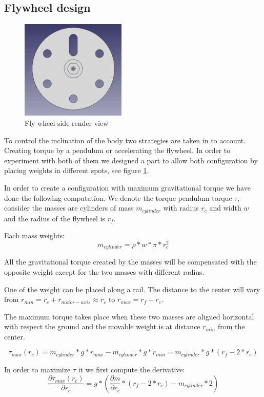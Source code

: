 \subsection{Flywheel design}
\begin{figure}
	\centering
	\includegraphics[width=5cm]{img/fly_wheel_side.png}
	\caption{Fly wheel side render view}
	\label{fig:Fly wheel side render view}
\end{figure}

To control the inclination of the body two strategies are taken in to account. Creating torque by a pendulum or accelerating the flywheel. In order to experiment with both of them we designed a part to allow both configuration by placing weights in different spots, see figure \ref{fig:Fly wheel side render view}.

In order to create a configuration with maximum gravitational torque we have done the following computation. We denote the torque pendulum torque $\tau$, consider the masses are cylinders of mass $m_{cylinder}$ with radius $r_c$ and width $w$ and the radius of the flywheel is $r_f$.

Each mass weights:
\[ m_{cylinder} = \rho * w * \pi * r_c^2 \]

All the gravitational torque created by the masses will be compensated with the opposite weight except for the two masses with different radius.

One of the weight can be placed along a rail. The distance to the center will vary from $r_{min} = r_c + r_{motor-axis} \approx r_c $ to $r_{max} = r_f - r_c$. 

The maximum torque takes place when these two masses are aligned horizontal with respect the ground and the movable weight is at distance $r_{min}$ from the center.

\[ \tau _{max} (r_c) =  m_{cylinder} * g * r_{max} -  m_{cylinder} * g * r_{min} =  m_{cylinder}* g * (r_f - 2 * r_c) \]

In order to maximize $\tau$ it we first compute the derivative:
\[\frac{\partial \tau _{max} (r_c)}{\partial r_c} = g *(\frac{\partial m}{\partial r_c} * (r_f - 2 * r_c) -  m_{cylinder} * 2)\]

